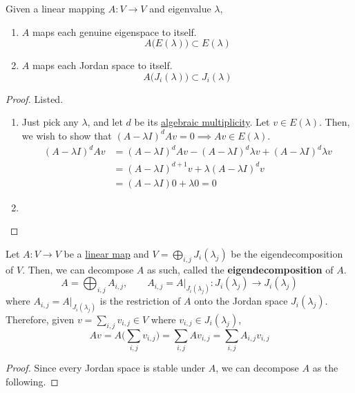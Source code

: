 	\begin{theorem}
	  \label{thm:invariance-of-eigenspaces-under-linear-map}
    Given a linear mapping $A: V \to V$ and eigenvalue $\lambda$, 
		\begin{enumerate}
		  \item $A$ maps each genuine eigenspace to itself. 
				\begin{equation}
					A\big( E(\lambda) \big) \subset E(\lambda)
				\end{equation}

			\item $A$ maps each Jordan space to itself. 
				\begin{equation}
					A\big( J_i(\lambda) \big) \subset J_i(\lambda)
				\end{equation}
		\end{enumerate}
  \end{theorem}
	\begin{proof}
		Listed. 
		\begin{enumerate}
		  \item Just pick any $\lambda$, and let $d$ be its \hyperref[def:algebraic-multiplicity]{algebraic multiplicity}. Let $v \in E(\lambda)$. Then, we wish to show that $(A - \lambda I)^d Av = 0 \implies Av \in E(\lambda)$. 
				\begin{align}
					(A - \lambda I)^d Av & = (A - \lambda I)^d Av - (A - \lambda I)^d \lambda v + (A - \lambda I)^d \lambda v \\ 
															 & = (A - \lambda I)^{d + 1} v + \lambda (A - \lambda I)^d v \\ 
															 & = (A - \lambda I) 0 + \lambda 0 = 0
				\end{align}

			\item 
		\end{enumerate}
	\end{proof}

  \begin{corollary}
    \label{thm:eigendecomposition-of-linear-maps}
		Let $A: V \to V$ be a \hyperref[def:linear_map]{linear map} and $V = \bigoplus_{i, j} J_i(\lambda_j)$ be the eigendecomposition of $V$. Then, we can decompose $A$ as such, called the \textbf{eigendecomposition} of $A$. 
		\begin{equation}
			A = \bigoplus_{i, j} A_{i, j}, \qquad A_{i, j} = A \big|_{J_i(\lambda_j)}: J_i(\lambda_j) \to J_i(\lambda_j)
		\end{equation}
		where $A_{i, j} = A \big|_{J_i(\lambda_j)}$ is the restriction of $A$ onto the Jordan space $J_i(\lambda_j)$. Therefore, given $v = \sum_{i, j} v_{i, j} \in V$ where $v_{i, j} \in J_i(\lambda_j)$, 
		\begin{equation}
			Av = A \bigg( \sum_{i, j} v_{i, j} \bigg) = \sum_{i, j} A v_{i, j} = \sum_{i, j} A_{i, j} v_{i, j}
		\end{equation}
  \end{corollary}
	\begin{proof}
		Since every Jordan space is stable under $A$, we can decompose $A$ as the following. 
	\end{proof}

